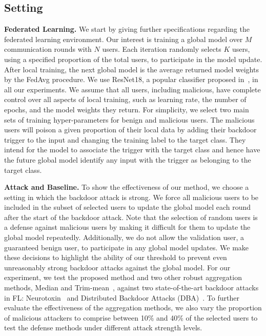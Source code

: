 \documentclass{article} %
\begin{document}
\subsection{Setting}

\textbf{Federated Learning.} We start by giving further specifications regarding the federated learning environment. Our interest is training a global model over $M$ communication rounds with $N$ users. Each iteration randomly selects $K$ users, using a specified proportion of the total users, to participate in the model update. After local training, the next global model is the average returned model weights by the FedAvg procedure. We use ResNet18, a popular classifier proposed in~\cite{resnet}, in all our experiments. We assume that all users, including malicious, have complete control over all aspects of local training, such as learning rate, the number of epochs, and the model weights they return. For simplicity, we select two main sets of training hyper-parameters for benign and malicious users. The malicious users will poison a given proportion of their local data by adding their backdoor trigger to the input and changing the training label to the target class. They intend for the model to associate the trigger with the target class and hence have the future global model identify any input with the trigger as belonging to the target class. 

\textbf{Attack and Baseline.} To show the effectiveness of our method, we choose a setting in which the backdoor attack is strong. We force all malicious users to be included in the subset of selected users to update the global model each round after the start of the backdoor attack. Note that the selection of random users is a defense against malicious users by making it difficult for them to update the global model repeatedly. Additionally, we do not allow the validation user, a guaranteed benign user, to participate in any global model updates. We make these decisions to highlight the ability of our threshold to prevent even unreasonably strong backdoor attacks against the global model. For our experiment, we test the proposed method and two other robust aggregation methods, Median and Trim-mean~\citep{trim-mean}, against two state-of-the-art backdoor attacks in FL: Neurotoxin~\citep{neurotoxin} and Distributed Backdoor Attacks (DBA)~\citep{dba}. To further evaluate the effectiveness of the aggregation methods, we also vary the proportion of malicious attackers to comprise between 10\% and 40\% of the selected users to test the defense methods under different attack strength levels.
\end{document}
